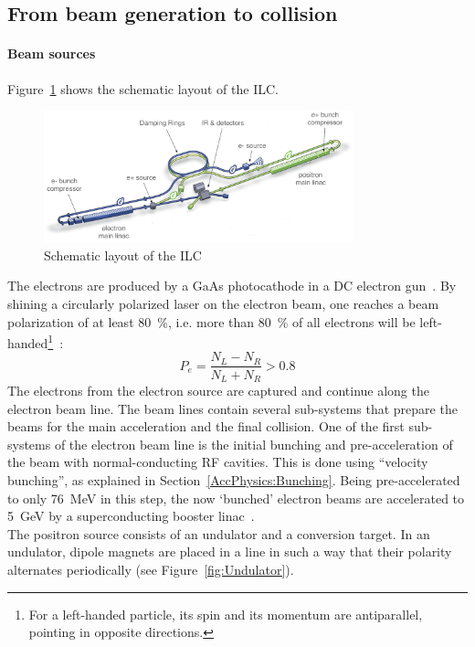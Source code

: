 \subsection{From beam generation to collision}
\label{ILC:layout:details}
\paragraph{Beam sources}
Figure~\ref{fig:ILC_Layout} shows the schematic layout of the ILC.
\begin{figure}
\centering
\includegraphics[width=0.8\textwidth]{Figures/ILC_layout_edited.png}
\caption[Schematic layout of the ILC]{Schematic layout of the ILC~\cite[based on p. 9]{TDR1}}
\label{fig:ILC_Layout}
\end{figure}
The electrons are produced by a GaAs photocathode in a DC electron gun~\cite[p. 13]{TDR32}.
By shining a circularly polarized laser on the electron beam, one reaches a beam polarization of at least \SI{80}{\percent}, i.e. more than \SI{80}{\percent} of all electrons will be left-handed\footnote{For a left-handed particle, its spin and its momentum are antiparallel, pointing in opposite directions.}~\cite[p. 81]{TDR32}:
\begin{equation}
 P_e = \frac{N_L-N_R}{N_L+N_R} > 0.8
\end{equation}
The electrons from the electron source are captured and continue along the electron beam line.
The beam lines contain several sub-systems that prepare the beams for the main acceleration and the final collision.
One of the first sub-systems of the electron beam line is the initial bunching and pre-acceleration of the beam with normal-conducting RF cavities.
This is done using ``velocity bunching'', as explained in Section~\ref{AccPhysics:Bunching}.
Being pre-accelerated to only \SI{76}{\MeV} in this step, the now `bunched' electron beams are accelerated to \SI{5}{\GeV} by a  superconducting booster linac~\cite[p. 81f]{TDR32}.\\
The positron source consists of an undulator and a conversion target.
In an undulator, dipole magnets are placed in a line in such a way that their polarity alternates periodically (see Figure~\ref{fig:Undulator}).
